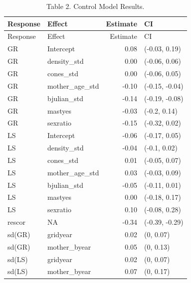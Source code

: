 \documentclass[
]{article}
\begin{document}
\begin{longtable}[]{@{}llrl@{}}
\caption{Table 2. Control Model Results.}\tabularnewline
\toprule\noalign{}
Response & Effect & Estimate & CI \\
\midrule\noalign{}
\endfirsthead
\toprule\noalign{}
Response & Effect & Estimate & CI \\
\midrule\noalign{}
\endhead
\bottomrule\noalign{}
\endlastfoot
GR & Intercept & 0.08 & (-0.03, 0.19) \\
GR & density\_std & 0.00 & (-0.06, 0.06) \\
GR & cones\_std & 0.00 & (-0.06, 0.05) \\
GR & mother\_age\_std & -0.10 & (-0.15, -0.04) \\
GR & bjulian\_std & -0.14 & (-0.19, -0.08) \\
GR & mastyes & -0.03 & (-0.2, 0.14) \\
GR & sexratio & -0.15 & (-0.32, 0.02) \\
LS & Intercept & -0.06 & (-0.17, 0.05) \\
LS & density\_std & -0.04 & (-0.1, 0.02) \\
LS & cones\_std & 0.01 & (-0.05, 0.07) \\
LS & mother\_age\_std & 0.03 & (-0.03, 0.09) \\
LS & bjulian\_std & -0.05 & (-0.11, 0.01) \\
LS & mastyes & 0.00 & (-0.18, 0.17) \\
LS & sexratio & 0.10 & (-0.08, 0.28) \\
rescor & NA & -0.34 & (-0.39, -0.29) \\
sd(GR) & gridyear & 0.02 & (0, 0.07) \\
sd(GR) & mother\_byear & 0.05 & (0, 0.13) \\
sd(LS) & gridyear & 0.02 & (0, 0.07) \\
sd(LS) & mother\_byear & 0.07 & (0, 0.17) \\
\end{longtable}
\end{document}
